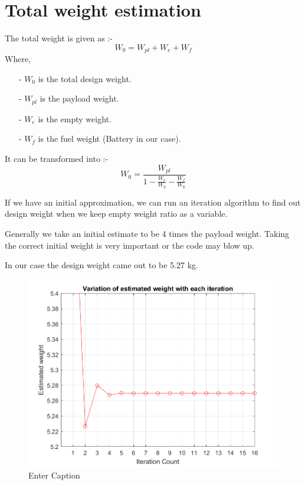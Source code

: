 \documentclass[12 pt]{article}
\begin{document}
\section{Total weight estimation}

The total weight is given as :- 
$$ W_0 = W_{pl} + W_{e} + W_{f} $$
Where,
\begin{itemize}
    \item[-] $W_0$ is the total design weight.
    \item [-] $W_{pl}$ is the payload weight.
    \item [-] $W_{e}$ is the empty weight.
    \item [-] $W_{f}$ is the fuel weight (Battery in our case).
\end{itemize}

It can be transformed into :- 
$$W_{0} = \frac{W_{pl}}{1 - \frac{W_{e}}{W_{0}} - \frac{W_{f}}{W_0}}$$

If we have an initial approximation, we can run an iteration algorithm to find out design weight when we keep empty weight ratio as a variable.

Generally we take an initial estimate to be 4 times the payload weight. Taking the correct initial weight is very important or the code may blow up.

In our case the design weight came out to be 5.27 kg.

\begin{figure}
    \centering
    \includegraphics[width=0.75\linewidth]{Mission profile pics/weight.png}
    \caption{Enter Caption}
    \label{fig:enter-label}
\end{figure}

\newpage
\end{document}
